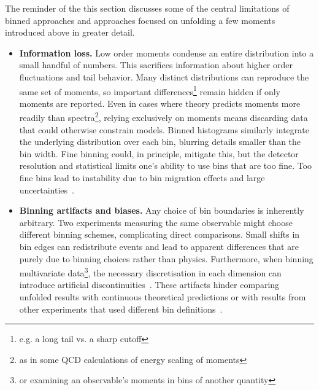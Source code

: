     The reminder of the this section discusses some of the central limitations of binned approaches and approaches focused on unfolding a few moments introduced above in greater detail.
    \begin{itemize}
        \item \textbf{Information loss.}
            Low order moments condense an entire distribution into a small handful of numbers.
            This sacrifices information about higher order fluctuations and tail behavior.
            Many distinct distributions can reproduce the same set of moments, so important differences\footnote{e.g. a long tail vs. a sharp cutoff} remain hidden if only moments are reported.
            Even in cases where theory predicts moments more readily than spectra\footnote{as in some QCD calculations of energy scaling of moments}, relying exclusively on moments means discarding data that could otherwise constrain models.
            Binned histograms similarly integrate the underlying distribution over each bin, blurring details smaller than the bin width.
            Fine binning could, in principle, mitigate this, but the detector resolution and statistical limits one's ability to use bins that are too fine.
            Too fine bins lead to instability due to bin migration effects and large uncertainties~\cite{Bessner:2017trm, LHCb:2023qav, ATLAS:2024hmk, CMS:2025dnx, Kutz:2024eaq, ATLAS:2016vlf}.
        \item \textbf{Binning artifacts and biases.}
            Any choice of bin boundaries is inherently arbitrary.
            Two experiments measuring the same observable might choose different binning schemes, complicating direct comparisons.
            Small shifts in bin edges can redistribute events and lead to apparent differences that are purely due to binning choices rather than physics.
            Furthermore, when binning multivariate data\footnote{or examining an observable's moments in bins of another quantity}, the necessary discretisation in each dimension can introduce artificial discontinuities~\cite{GomezAmbrosio:2022mpm, Fiorendi:2014klw, KLOE-2:2025ggc, Ressegotti:2024szk, LHCb:2025eyf, Grosso:2024nho,}.
            These artifacts hinder comparing unfolded results with continuous theoretical predictions or with results from other experiments that used different bin definitions~\cite{Brehmer:2018hga}.
            

\end{itemize}
